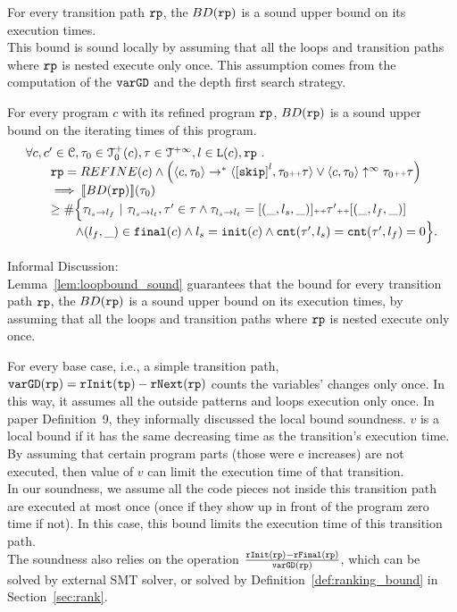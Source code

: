 For every transition path $\mathtt{rp}$, the $BD(\mathtt{rp})$
is a sound upper bound on its execution times.
\\
This bound is sound locally by assuming
that all the loops and transition paths where $\mathtt{rp}$ is nested execute only once.
This assumption comes from the computation of the $\mathtt{varGD}$ and the depth first search strategy.
\\
%
\begin{lemma}
    For every program $c$ with its refined program $\mathtt{rp}$,
    $BD(\mathtt{rp})$ is a sound upper bound on the iterating times of this program.
    \[
      \begin{array}{l}
      \forall c, c' \in \cdom, \trace_0 \in \ftdom_0(c), \trace \in \tdom, l \in \lvar(c), \rprog \st 
      \\ \qquad
      \rprog = REFINE(c)
      \land 
      \Big(
        \config{c, \trace_0} \to^* \config{\clabel{\eskip}^{l}, \trace_0 \tracecat \trace}
        \lor \config{c, \trace_0} \uparrow^{\infty} \trace_0 \tracecat \trace 
        \Big)
      \\ \qquad
      \implies
      \econfig{BD(\rprog)}(\trace_0) 
      \\ \qquad \geq 
      \# \Big\{\trace_{l_s \to l_f} ~\vert~ \trace_{l_s \to l_t}, \trace' \in \trace \land \trace_{l_s \to l_t} = [(\_, l_s, \_)] \tracecat \trace' \tracecat [(\_, l_f, \_)]
      \\ \qquad \qquad
      \land (l_{f}, \_) \in \absfinal(c)
      \land l_s = \absinit(c)
      \land \counter(\trace', l_s) = \counter(\trace', l_f) = 0 
      \Big\}.
      \end{array}
    \]
    \end{lemma}
  Informal Discussion: \\
  Lemma~\ref{lem:loopbound_sound} guarantees that
  the bound for every transition path $\mathtt{rp}$, the $BD(\mathtt{rp})$
  is a sound upper bound on its execution times, by assuming
  that all the loops and transition paths where $\mathtt{rp}$ is nested execute only once.

For every base case, i.e., a simple transition path, 
$\mathtt{varGD}(\mathtt{rp}) =  \mathtt{rInit}(\mathtt{tp}) - \mathtt{rNext}(\mathtt{rp})$
counts the variables' changes only once. In this way, it assumes all the outside patterns and loops execution only once.
In paper \cite{sinn2017complexity} Definition~9, they informally discussed the local bound soundness.
$v$ is a local bound if it has the same decreasing time as the transition's execution time.
By assuming that certain program parts (those were e increases) are not executed,
then value of $v$ can limit the execution time of that transition.
\\
In our soundness, we assume all the code pieces not inside this transition path are executed at most once (once if they show up in front of the program
zero time if not).
In this case, this bound limits the execution time of this transition path.
\\
The soundness also relies on the operation $\frac{\mathtt{rInit}(\mathtt{rp}) - \mathtt{rFinal}(\mathtt{rp})}{\mathtt{varGD}(\mathtt{rp})}$,
which can be solved by external SMT solver,
or solved by Definition~\ref{def:ranking_bound} in Section~\ref{sec:rank}.


